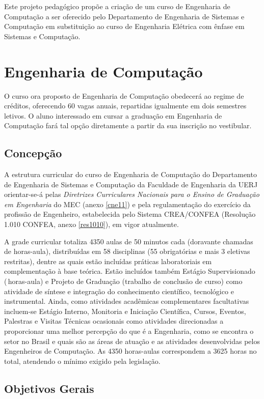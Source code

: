 Este projeto pedagógico propõe a criação de um curso de Engenharia de Computação a ser oferecido pelo Departamento de Engenharia de Sistemas e Computação em substituição ao curso de Engenharia Elétrica com ênfase em Sistemas e Computação.

\chapter{Engenharia de Computação}
O curso ora proposto de Engenharia de Computação obedecerá ao regime de créditos, oferecendo 60 vagas anuais, repartidas igualmente em dois semestres letivos. O aluno interessado em cursar a graduação em Engenharia de Computação fará tal opção diretamente a partir da sua inscrição no vestibular.

\section{Concepção}

A estrutura curricular do curso de Engenharia de Computação do Departamento de Engenharia de Sistemas e Computação da Faculdade de Engenharia da UERJ orientar-se-á pelas \textit{Diretrizes Curriculares Nacionais para o Ensino de Graduação em Engenharia} do MEC (anexo \ref{cne11}) e pela regulamentação do exercício da profissão de Engenheiro, estabelecida pelo Sistema CREA/CONFEA (Resolução 1.010 CONFEA, anexo \ref{res1010}), em vigor atualmente. 

A grade curricular totaliza 4350 aulas de 50 minutos cada (doravante chamadas de horas-aula), distribuídas em 58 disciplinas (55 obrigatórias e mais 3 eletivas restritas), dentre as quais estão incluídas práticas laboratoriais em complementação à base teórica. Estão incluídos também Estágio Supervisionado (\EstSupCH\,horas-aula) e Projeto de Graduação (trabalho de conclusão de curso) como atividade de síntese e integração do conhecimento científico, tecnológico e instrumental. Ainda, como atividades acadêmicas complementares facultativas incluem-se Estágio Interno, Monitoria e Iniciação Científica, Cursos, Eventos, Palestras e Visitas Técnicas ocasionais como atividades direcionadas a proporcionar uma melhor percepção do que é a Engenharia, como se encontra o setor no Brasil e quais são as áreas de atuação e as atividades desenvolvidas pelos Engenheiros de Computação. As 4350 horas-aulas correspondem a 3625 horas no total, atendendo o mínimo exigido pela legislação. 

\section{Objetivos Gerais}

